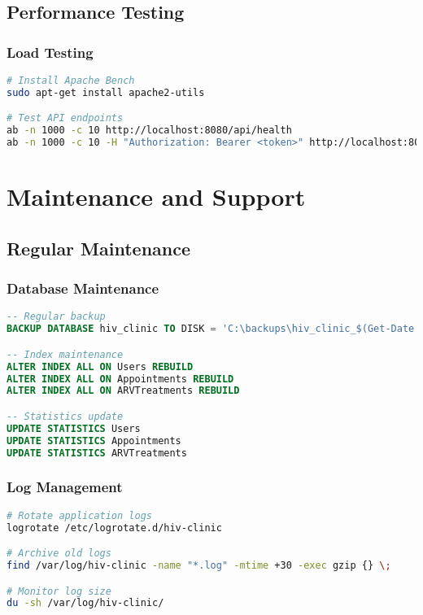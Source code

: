 \documentclass[12pt,a4paper]{article}
\begin{document}
\subsection{Performance Testing}

\subsubsection{Load Testing}

\begin{lstlisting}[language=bash, caption=Load Testing]
# Install Apache Bench
sudo apt-get install apache2-utils

# Test API endpoints
ab -n 1000 -c 10 http://localhost:8080/api/health
ab -n 1000 -c 10 -H "Authorization: Bearer <token>" http://localhost:8080/api/appointments/patient/my-appointments
\end{lstlisting}

\section{Maintenance and Support}

\subsection{Regular Maintenance}

\subsubsection{Database Maintenance}

\begin{lstlisting}[language=SQL, caption=Database Maintenance]
-- Regular backup
BACKUP DATABASE hiv_clinic TO DISK = 'C:\backups\hiv_clinic_$(Get-Date -Format 'yyyy-MM-dd').bak'

-- Index maintenance
ALTER INDEX ALL ON Users REBUILD
ALTER INDEX ALL ON Appointments REBUILD
ALTER INDEX ALL ON ARVTreatments REBUILD

-- Statistics update
UPDATE STATISTICS Users
UPDATE STATISTICS Appointments
UPDATE STATISTICS ARVTreatments
\end{lstlisting}

\subsubsection{Log Management}

\begin{lstlisting}[language=bash, caption=Log Management]
# Rotate application logs
logrotate /etc/logrotate.d/hiv-clinic

# Archive old logs
find /var/log/hiv-clinic -name "*.log" -mtime +30 -exec gzip {} \;

# Monitor log size
du -sh /var/log/hiv-clinic/
\end{lstlisting}
\end{document}
